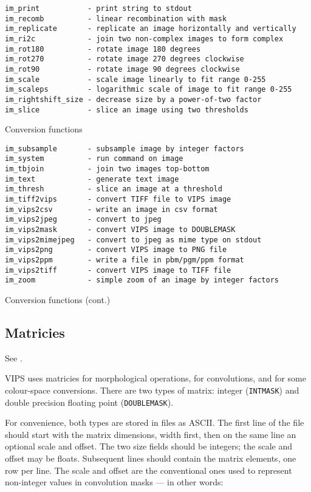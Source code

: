 \begin{fig2}
\begin{verbatim}
im_print           - print string to stdout
im_recomb          - linear recombination with mask
im_replicate       - replicate an image horizontally and vertically
im_ri2c            - join two non-complex images to form complex
im_rot180          - rotate image 180 degrees
im_rot270          - rotate image 270 degrees clockwise
im_rot90           - rotate image 90 degrees clockwise
im_scale           - scale image linearly to fit range 0-255
im_scaleps         - logarithmic scale of image to fit range 0-255
im_rightshift_size - decrease size by a power-of-two factor
im_slice           - slice an image using two thresholds
\end{verbatim}
\caption{Conversion functions}
\label{fg:conversion}
\end{fig2}

\begin{fig2}
\begin{verbatim}
im_subsample       - subsample image by integer factors
im_system          - run command on image
im_tbjoin          - join two images top-bottom
im_text            - generate text image
im_thresh          - slice an image at a threshold
im_tiff2vips       - convert TIFF file to VIPS image
im_vips2csv        - write an image in csv format
im_vips2jpeg       - convert to jpeg
im_vips2mask       - convert VIPS image to DOUBLEMASK
im_vips2mimejpeg   - convert to jpeg as mime type on stdout
im_vips2png        - convert VIPS image to PNG file
im_vips2ppm        - write a file in pbm/pgm/ppm format
im_vips2tiff       - convert VIPS image to TIFF file
im_zoom            - simple zoom of an image by integer factors
\end{verbatim}
\caption{Conversion functions (cont.)}
\end{fig2}

\subsection{Matricies}

See .

VIPS uses matricies for morphological operations, for convolutions, and
for some colour-space conversions. There are two types of matrix: integer
(\verb+INTMASK+) and double precision floating point (\verb+DOUBLEMASK+).

For convenience, both types are stored in files as ASCII. The first
line of the file should start with the matrix dimensions, width first,
then on the same line an optional scale and offset. The two size fields
should be integers; the scale and offset may be floats. Subsequent lines
should contain the matrix elements, one row per line.  The scale and
offset are the conventional ones used to represent non-integer values in
convolution masks --- in other words:

